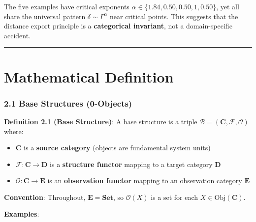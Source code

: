 \documentclass[
]{article}
\providecommand{\tightlist}{%
  \setlength{\itemsep}{0pt}\setlength{\parskip}{0pt}}
\begin{document}
The five examples have critical exponents
\(\alpha \in \{1.84, 0.50, 0.50, 1, 0.50\}\), yet all share the
universal pattern \(\delta \sim \Gamma^\alpha\) near critical points.
This suggests that the distance export principle is a
\textbf{categorical invariant}, not a domain-specific accident.

\begin{center}\rule{0.5\linewidth}{0.5pt}\end{center}

\section{Mathematical Definition}\label{mathematical-definition}

\subsubsection{2.1 Base Structures
(0-Objects)}\label{base-structures-0-objects}

\textbf{Definition 2.1 (Base Structure)}: A base structure is a triple
\(\mathcal{B} = (\mathbf{C}, \mathcal{F}, \mathcal{O})\) where:

\begin{itemize}
\tightlist
\item
  \(\mathbf{C}\) is a \textbf{source category} (objects are fundamental
  system units)
\item
  \(\mathcal{F}: \mathbf{C} \to \mathbf{D}\) is a \textbf{structure
  functor} mapping to a target category \(\mathbf{D}\)
\item
  \(\mathcal{O}: \mathbf{C} \to \mathbf{E}\) is an \textbf{observation
  functor} mapping to an observation category \(\mathbf{E}\)
\end{itemize}

\textbf{Convention}: Throughout, \(\mathbf{E} = \mathbf{Set}\), so
\(\mathcal{O}(X)\) is a set for each \(X \in \text{Obj}(\mathbf{C})\).

\textbf{Examples}:
\end{document}
